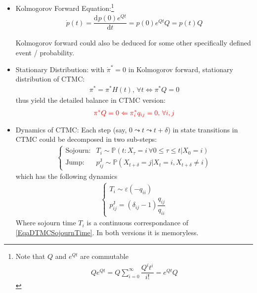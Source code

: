 \begin{itemize}[topsep=2pt,itemsep=0pt]
    Comment: with Gershgorin Circle Theorem \footnote{Detail see \url{https://v1ncent19.github.io/texts/DiagonalDominant/}.}, $ Q $ as a diagonal dominant matrix, is negative definite, which guarentee the convergence of $ H(t)=e^{Qt}<\infty $
    \item Kolmogorov Forward Equation:\footnote{Note that $ Q $ and $ e^{Qt} $ are commutable
    \begin{align}
         Qe^{Qt}=Q\sum_{i=0}^\infty\dfrac{Q^it^i}{i!}=e^{Qt}Q
    \end{align}
    }
    \begin{align}
        \dot{p}(t)=\dfrac{\mathrm{d}^{} p(0)e^{Qt}}{\mathrm{d}t}=p(0)e^{Qt}Q=p(t)Q
    \end{align}

    Kolmogorov forward could also be deduced for some other specifically defined event / probability. 
    \item Stationary Distribution: with $ \dot{\pi}^*=0 $ in Kolmogorov forward, stationary distribution of CTMC:
    \begin{align}
         \pi^*=\pi^*H(t),\,\forall t\Leftrightarrow \pi^*Q=0
    \end{align}
    thus yield the detailed balance in CTMC version:
    \begin{align}
         \color{red}\pi^*Q=0\Leftarrow \pi^*_iq_{ij}=0,\,\forall i,j
    \end{align}
    \item Dynamics of CTMC: Each step (say, $ 0\leadsto t\leadsto t+\delta  $) in state transitions in CTMC could be decomposed in two sub-steps:
    \begin{align}
        \begin{cases}
            \text{Sojourn}:&T_i\sim \mathbb{P}\left(t: X_\tau=i\,\forall 0\leq \tau\leq t\big| X_0=i \right)\\
            \text{Jump}:&p_{ij}^\mathrm{J}\sim  \mathbb{P}\left( X_{t+\delta}=j\big| X_t=i,X_{t+\delta }\neq i\right) 
        \end{cases}
    \end{align}
    which has the following dynamics
    \begin{align}
        \begin{cases}
            T_i\sim \varepsilon (-q_{ii})\\
            p_{ij}^\mathrm{J}=(\delta _{ij}-1)\dfrac{q_{ij}}{q_{ii}} 
        \end{cases} 
    \end{align}
    Where sojourn time $ T_i $ is a continuous correspondance of \ref{EqaDTMCSojournTime}. In both versions it is memoryless.
\end{itemize}

